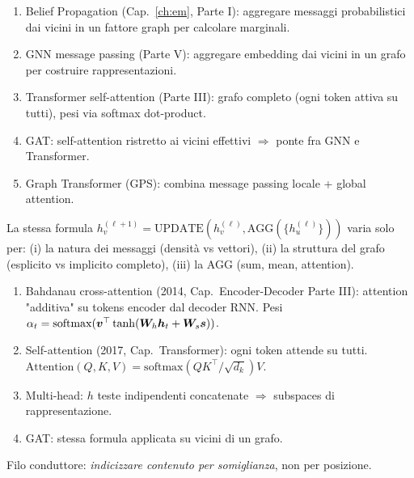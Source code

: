 \begin{tcolorbox}[mywarn, title={Message passing: collega PGM, GNN e Transformer}]
\begin{enumerate}
  \item Belief Propagation (Cap.~\ref{ch:em}, Parte I): aggregare messaggi probabilistici dai vicini in un fattore graph per calcolare marginali.
  \item GNN message passing (Parte V): aggregare embedding dai vicini in un grafo per costruire rappresentazioni.
  \item Transformer self-attention (Parte III): grafo completo (ogni token attiva su tutti), pesi via softmax dot-product.
  \item GAT: self-attention ristretto ai vicini effettivi $\Rightarrow$ ponte fra GNN e Transformer.
  \item Graph Transformer (GPS): combina message passing locale + global attention.
\end{enumerate}
La stessa formula $h_v^{(\ell+1)} = \text{UPDATE}(h_v^{(\ell)}, \text{AGG}(\{h_u^{(\ell)}\}))$ varia solo per: (i) la natura dei messaggi (densità vs vettori), (ii) la struttura del grafo (esplicito vs implicito completo), (iii) la AGG (sum, mean, attention).
\end{tcolorbox}

\begin{tcolorbox}[mywarn, title={Attention: dall'attenzione di Bahdanau ai GAT}]
\begin{enumerate}
  \item Bahdanau cross-attention (2014, Cap.~Encoder-Decoder Parte III): attention "additiva" su tokens encoder dal decoder RNN. Pesi $\alpha_t = \mathrm{softmax}(\bm{v}^\top \tanh(\bm{W}_h \bm{h}_t + \bm{W}_s \bm{s}))$.
  \item Self-attention (2017, Cap.~Transformer): ogni token attende su tutti. $\mathrm{Attention}(Q,K,V) = \mathrm{softmax}(QK^\top/\sqrt{d_k})V$.
  \item Multi-head: $h$ teste indipendenti concatenate $\Rightarrow$ subspaces di rappresentazione.
  \item GAT: stessa formula applicata su vicini di un grafo.
\end{enumerate}
Filo conduttore: \emph{indicizzare contenuto per somiglianza}, non per posizione.
\end{tcolorbox}

